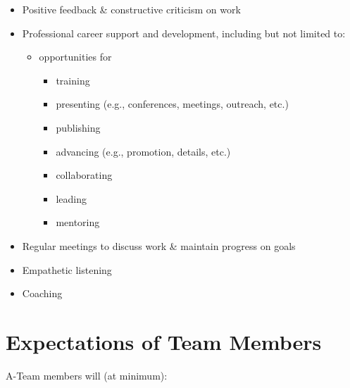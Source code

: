 \documentclass[
  letterpaper,
  DIV=11,
  numbers=noendperiod]{scrreprt}
\providecommand{\tightlist}{%
  \setlength{\itemsep}{0pt}\setlength{\parskip}{0pt}}\usepackage{longtable,booktabs,array}
\begin{document}
\begin{itemize}
\tightlist
\item
  Positive feedback \& constructive criticism on work\\
\item
  Professional career support and development, including but not limited
  to:

  \begin{itemize}
  \tightlist
  \item
    opportunities for

    \begin{itemize}
    \tightlist
    \item
      training\\
    \item
      presenting (e.g., conferences, meetings, outreach, etc.)\\
    \item
      publishing
    \item
      advancing (e.g., promotion, details, etc.)\\
    \item
      collaborating\\
    \item
      leading\\
    \item
      mentoring
    \end{itemize}
  \end{itemize}
\item
  Regular meetings to discuss work \& maintain progress on goals\\
\item
  Empathetic listening\\
\item
  Coaching
\end{itemize}

\hypertarget{expectations-of-team-members}{%
\section{Expectations of Team
Members}\label{expectations-of-team-members}}

A-Team members will (at minimum):
\end{document}
